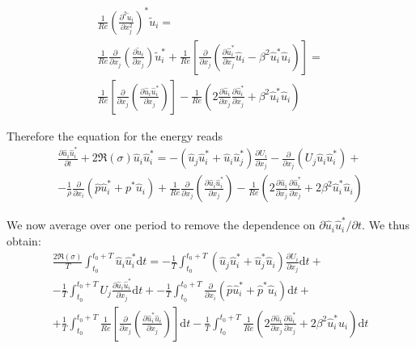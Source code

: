 \documentclass{jfm}
\begin{document}
\begin{itemize}
\begin{equation}
\begin{gathered}
    \frac{1}{Re} \left( \frac{\partial^2 \tilde{u}_i}{\partial x_j^2} \right)^* \tilde{u}_i = \\
    \frac{1}{Re} \frac{\partial}{\partial x_j} \left( \frac{\partial \tilde{u}_i}{\partial x_j} \right) \tilde{u}_i^* +
    \frac{1}{Re} \left[ \frac{\partial}{\partial x_j} \left( \frac{\partial \hat{u}_i^*}{\partial x_j} \hat{u}_i - \beta^2 \hat{u}_i^* \hat{u}_i \right) \right] = \\
    \frac{1}{Re} \left[ \frac{\partial}{\partial x_j} \left( \frac{\partial \hat{u}_i \hat{u}_i^*}{\partial x_j} \right) \right]
   -\frac{1}{Re} \left( 2 \frac{\partial \hat{u}_i}{\partial x_j} \frac{\partial \hat{u}_i^*}{\partial x_j} + \beta^2 \hat{u}_i^* \hat{u}_i \right)
  \end{gathered}
  \end{equation}
\end{itemize}

Therefore the equation for the energy reads
%
\begin{equation}
\begin{gathered}
\frac{\partial \hat{u}_i \hat{u}_i^*}{\partial t} + 2 \Re(\sigma) \hat{u}_i \hat{u}_i^* = 
- \left( \hat{u}_j \hat{u}_i^* + \hat{u}_i \hat{u}_j^* \right) \frac{\partial U_i}{\partial x_j} -
\frac{\partial}{\partial x_j} \left( U_j \hat{u}_i \hat{u}_i^*\right)  + \\
- \frac{1}{\rho} \frac{\partial}{\partial x_i} \left( \hat{p} \hat{u}_i^* + p^* \hat{u}_i \right) +
\frac{1}{Re} \frac{\partial}{\partial x_j} \left( \frac{ \partial \hat{u}_i \hat{u}_i^*}{\partial x_j} \right) 
- \frac{1}{Re} \left( 2 \frac{\partial \hat{u}_i}{\partial x_j} \frac{\partial \hat{u}_i^*}{\partial x_j} + 2 \beta^2 \hat{u}_i^* \hat{u}_i \right) 
\end{gathered} 
\end{equation}

%
We now average over one period to remove the dependence on $\partial \hat{u}_i \hat{u}_i^*/\partial t$. We thus obtain:
%
\begin{equation}
  \begin{gathered}
  \frac{2 \Re(\sigma)}{T} \int_{t_0}^{t_0+T} \hat{u}_i \hat{u}_i^* \text{d}t = 
 -\frac{1}{T} \int_{t_0}^{t_0+T} \left( \hat{u}_j \hat{u}_i^* + \hat{u}_j^* \hat{u}_i \right) \frac{\partial U_i}{\partial x_j} \text{d} t +\\
 -\frac{1}{T} \int_{t_0}^{t_0+T} U_j \frac{\partial \hat{u}_i \hat{u}_i^*}{\partial x_j} \text{d} t + 
 -\frac{1}{T} \int_{t_0}^{t_0+T} \frac{\partial}{\partial x_i} \left( \hat{p} \hat{u}_i^* + \hat{p}^* \hat{u}_i \right) \text{d}t + \\
 +\frac{1}{T} \int_{t_0}^{t_0+T} \frac{1}{Re} \left[ \frac{\partial}{\partial x_j} \left( \frac{\partial \hat{u}_i^* \hat{u}_i }{\partial x_j} \right) \right] \text{d}t 
 -\frac{1}{T} \int_{t_0}^{t_0+T} \frac{1}{Re} \left( 2 \frac{\partial \hat{u}_i}{\partial x_j} \frac{\partial \hat{u}_i^*}{\partial x_j} + 2 \beta^2 \hat{u}_i^* \hat{u}_i \right) \text{d} t
 \end{gathered}
\end{equation}
\end{document}
